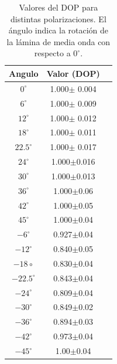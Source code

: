 \documentclass[11pt,a4paper]{article}
\begin{document}
\begin{table}[H]
\centering
\begin{tabular}{ccc}
\hline
Angulo & Valor (DOP) \\
\hline
$0^{\circ}$  & 1.000$\pm$ 0.004 \\
$6^{\circ}$  & 1.000$\pm$ 0.009 \\
$12^{\circ}$  & 1.000$\pm$ 0.012 \\
$18^{\circ}$  & 1.000$\pm$ 0.011  \\
$22.5^{\circ}$ & 1.000$\pm$ 0.017 \\
$24^{\circ}$  & 1.000$\pm$0.016  \\
$30^{\circ}$  & 1.000$\pm$0.013   \\
$36^{\circ}$  & 1.000$\pm$0.06   \\
$42^{\circ}$ & 1.000$\pm$0.05    \\
$45^{\circ}$  & 1.000$\pm$0.04  \\
$-6^{\circ}$  & 0.927$\pm$0.04  \\
$-12^{\circ}$  & 0.840$\pm$0.05  \\
$-18{\circ}$ & 0.830$\pm$0.04    \\
$-22.5^{\circ}$  & 0.843$\pm$0.04 \\
$-24^{\circ}$  & 0.809$\pm$0.04   \\
$-30^{\circ}$  & 0.849$\pm$0.02  \\
$-36^{\circ}$ & 0.894$\pm$0.03   \\
$-42^{\circ}$  & 0.973$\pm$0.04 \\
$-45^{\circ}$  & 1.00$\pm$0.04   \\
\hline
\end{tabular}
\caption{Valores del DOP para distintas polarizaciones. El ángulo indica la rotación de la lámina de media onda con respecto a $0^{\circ}$.}
\label{tabla: dops}
\end{table}
\end{document}

